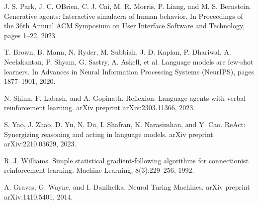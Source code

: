 \vspace{0.3cm}
\noindent [7] J. S. Park, J. C. OBrien, C. J. Cai, M. R. Morris, P. Liang, and M. S. Bernstein. Generative agents: Interactive simulacra of human behavior. In Proceedings of the 36th Annual ACM Symposium on User Interface Software and Technology, pages 1--22, 2023.

\vspace{0.3cm}
\noindent [8] T. Brown, B. Mann, N. Ryder, M. Subbiah, J. D. Kaplan, P. Dhariwal, A. Neelakantan, P. Shyam, G. Sastry, A. Askell, et al. Language models are few-shot learners. In Advances in Neural Information Processing Systems (NeurIPS), pages 1877--1901, 2020.

\vspace{0.3cm}
\noindent [9] N. Shinn, F. Labash, and A. Gopinath. Reflexion: Language agents with verbal reinforcement learning. arXiv preprint arXiv:2303.11366, 2023.

\vspace{0.3cm}
\noindent [10] S. Yao, J. Zhao, D. Yu, N. Du, I. Shafran, K. Narasimhan, and Y. Cao. ReAct: Synergizing reasoning and acting in language models. arXiv preprint arXiv:2210.03629, 2023.


\vspace{0.3cm}
\noindent [11] R. J. Williams. Simple statistical gradient-following algorithms for connectionist reinforcement learning. Machine Learning, 8(3):229--256, 1992.

\vspace{0.3cm}
\noindent [12] A. Graves, G. Wayne, and I. Danihelka. Neural Turing Machines. arXiv preprint arXiv:1410.5401, 2014.

